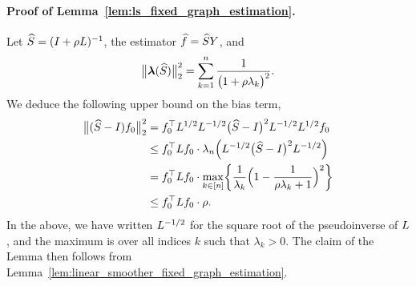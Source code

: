 \paragraph{Proof of Lemma~\ref{lem:ls_fixed_graph_estimation}.}
Let $\widehat{S} = (I + \rho L)^{-1}$, the estimator $\widehat{f} = \widehat{S}Y$, and
\begin{equation*}
\bigl\|\boldsymbol{\lambda}(\widehat{S})\bigr\|_2^2 = \sum_{k = 1}^{n} \frac{1}{\bigl(1 + \rho \lambda_k\bigr)^2}.
\end{equation*} 
We deduce the following upper bound on the bias term,
\begin{equation*}
\begin{aligned}
\bigl\|(\widehat{S} - I)f_0\bigr\|_2^2 & = f_0^{\top} L^{1/2} L^{-1/2}\bigl(\widehat{S} - I\bigr)^2 L^{-1/2} L^{1/2} f_0 \\
& \leq f_0^{\top} L f_0 \cdot \lambda_n\Bigl(L^{-1/2}\bigl(\widehat{S} - I\bigr)^2 L^{-1/2}\Bigr) \\
& = f_0^{\top} L f_0 \cdot \max_{k \in [n]} \biggl\{\frac{1}{\lambda_k} \Bigl(1 - \frac{1}{\rho\lambda_k + 1}\Bigr)^2 \biggr\} \\
& \leq f_0^{\top} L f_0 \cdot \rho.
\end{aligned}
\end{equation*} 
In the above, we have written $L^{-1/2}$ for the square root of the pseudoinverse of $L$, and the maximum is over all indices $k$ such that $\lambda_k > 0$. The claim of the Lemma then follows from Lemma~\ref{lem:linear_smoother_fixed_graph_estimation}.

